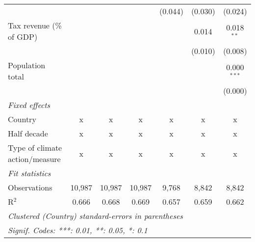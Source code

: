 \begin{tabular}{lcccccc}
                                                 &         &               &                & (0.044)        & (0.030)        & (0.024)\\   
   Tax revenue (\% of GDP)                       &         &               &                &                & 0.014          & 0.018$^{**}$\\   
                                                 &         &               &                &                & (0.010)        & (0.008)\\   
   Population total                              &         &               &                &                &                & 0.000$^{***}$\\   
                                                 &         &               &                &                &                & (0.000)\\   
   \emph{Fixed effects}\\
   Country                                       & x       & x             & x              & x              & x              & x\\  
   Half decade                                   & x       & x             & x              & x              & x              & x\\  
   Type of climate action/measure                & x       & x             & x              & x              & x              & x\\  
   \midrule \emph{Fit statistics}\\
   Observations                                  & 10,987  & 10,987        & 10,987         & 9,768          & 8,842          & 8,842\\  
   R$^2$                                         & 0.666   & 0.668         & 0.669          & 0.657          & 0.659          & 0.662\\  
   \midrule
   \multicolumn{7}{l}{\emph{Clustered (Country) standard-errors in parentheses}}\\
   \multicolumn{7}{l}{\emph{Signif. Codes: ***: 0.01, **: 0.05, *: 0.1}}\\
\end{tabular}
\par\endgroup


